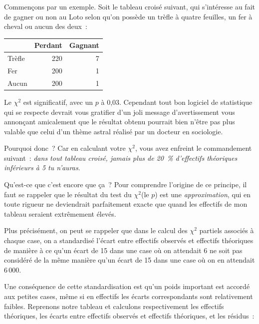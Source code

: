 \documentclass[a4paper,10pt,twoside,francais]{report}
\newcommand{\chid}{$\chi^2$\xspace}
\begin{document}
Commençons par un exemple. Soit le tableau croisé suivant, qui
s'intéresse au fait de gagner ou non au Loto selon qu'on possède un
trèfle à quatre feuilles, un fer à cheval ou aucun des deux~:


\begin{table}[H]
  \begin{center}
    \begin{tabular}[!h]{lrr}
      \toprule
      & Perdant & Gagnant \\
      \midrule
      Trèfle & 220 & 7  \\
      Fer & 200 & 1  \\
      Aucun & 200 & 1 \\ 
      \bottomrule
    \end{tabular}
  \end{center}
\end{table}


Le \chid est significatif, avec un $p$ à 0,03. Cependant tout bon
logiciel de statistique qui se respecte devrait vous gratifier d'un
joli message d'avertissement vous annonçant amicalement que le
résultat obtenu pourrait bien n'être pas plus valable que celui d'un
thème astral réalisé par un docteur en sociologie.

Pourquoi donc~? Car en calculant votre \chid, vous avez enfreint le
commandement suivant~: \textit{dans tout tableau croisé, jamais plus
  de 20~\% d'effectifs théoriques inférieurs à 5 tu n'auras}.

Qu'est-ce que c'est encore que ça~?  Pour comprendre l'origine de ce
principe, il faut se rappeler que le résultat du test du \chid (le
$p$) est une \textit{approximation}, qui en toute rigueur ne
deviendrait parfaitement exacte que quand les effectifs de mon tableau
seraient extrêmement élevés.

Plus précisément, on peut se rappeler que dans le calcul des \chid
partiels associés à chaque case, on a \og standardisé \fg{} l'écart
entre effectifs observés et effectifs théoriques de manière à ce qu'un
écart de 15 dans une case où on attendait 6 ne soit pas considéré de
la même manière qu'un écart de 15 dans une case où on en attendait
6\,000.

Une conséquence de cette standardisation est qu'un poids important est
accordé aux petites cases, même si en effectifs les écarts
correspondants sont relativement faibles. Reprenons notre tableau et
calculons respectivement les effectifs théoriques, les écarts entre
effectifs observés et effectifs théoriques, et les résidus~:
\end{document}
